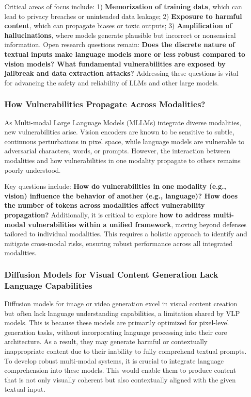 Critical areas of focus include: 1) \textbf{Memorization of training data}, which can lead to privacy breaches or unintended data leakage; 2) \textbf{Exposure to harmful content}, which can propagate biases or toxic outputs; 3) \textbf{Amplification of hallucinations}, where models generate plausible but incorrect or nonsensical information. Open research questions remain:
\textbf{Does the discrete nature of textual inputs make language models more or less robust compared to vision models? What fundamental vulnerabilities are exposed by jailbreak and data extraction attacks? }
Addressing these questions is vital for advancing the safety and reliability of LLMs and other large models.

\subsubsection{How Vulnerabilities Propagate Across Modalities?}
As Multi-modal Large Language Models (MLLMs) integrate diverse modalities, new vulnerabilities arise. Vision encoders are known to be sensitive to subtle, continuous perturbations in pixel space, while language models are vulnerable to adversarial characters, words, or prompts. However, the interaction between modalities and how vulnerabilities in one modality propagate to others remains poorly understood.

Key questions include: \textbf{How do vulnerabilities in one modality (e.g., vision) influence the behavior of another (e.g., language)? How does the number of tokens across modalities affect vulnerability propagation?}
Additionally, it is critical to explore \textbf{how to address multi-modal vulnerabilities within a unified framework}, moving beyond defenses tailored to individual modalities. This requires a holistic approach to identify and mitigate cross-modal risks, ensuring robust performance across all integrated modalities.


\subsubsection{Diffusion Models for Visual Content Generation Lack Language Capabilities}

Diffusion models for image or video generation excel in visual content creation but often lack language understanding capabilities, a limitation shared by VLP models. This is because these models are primarily optimized for pixel-level generation tasks, without incorporating language processing into their core architecture. As a result, they may generate harmful or contextually inappropriate content due to their inability to fully comprehend textual prompts.
To develop robust multi-modal systems, it is crucial to integrate language comprehension into these models. This would enable them to produce content that is not only visually coherent but also contextually aligned with the given textual input.

